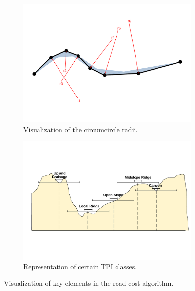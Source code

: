             \begin{figure}[ht]
            \centering
            \begin{subfigure}[b]{0.9\textwidth}
                \centering
                \includegraphics[trim={0cm 3.55cm 0cm 2.8cm}, clip, width=\textwidth]{images/path_curvature.pdf}
                \caption{Visualization of the circumcircle radii.}
                \label{fig:curvature}
            \end{subfigure}
            \begin{subfigure}[b]{0.9\textwidth}
                \centering
                \includegraphics[trim={0cm 5.2cm 0cm 5.2cm}, clip, width=\textwidth]{images/TPI_classification.pdf}
                \caption{Representation of certain TPI classes.}
                \label{fig:TPI}
            \end{subfigure}
            \caption{Visualization of key elements in the road cost algorithm.}
        \end{figure}

